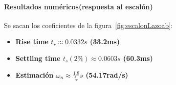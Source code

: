 \paragraph{Resultados numéricos(respuesta al escalón)} Se sacan los coeficientes de la figura~\ref{fig:escalonLazoab}:
\begin{itemize}
	\item \textbf{Rise time $t_r \approx 0.0332 s$ (33.2ms)}
	\item \textbf{Settling time $t_s(2\%) \approx 0.0603 s$ (60.3ms)}
	\item \textbf{Estimación $\omega_n \approx \frac{1.8}{t_r} s$ (54.17rad/s)}
\end{itemize}



